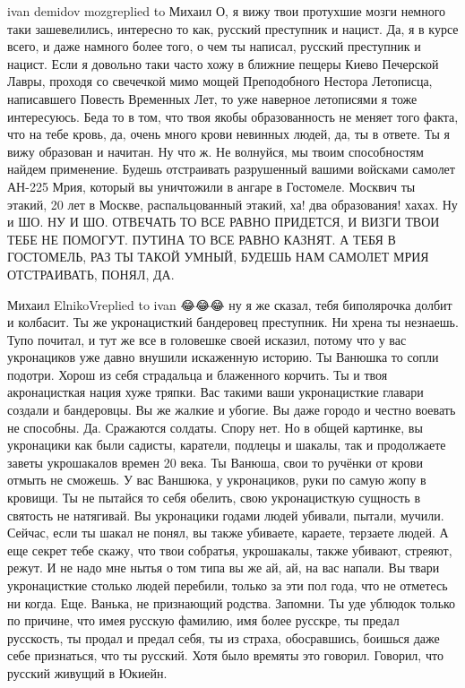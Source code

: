  
 
 
 
 


ivan demidov mozgreplied to Михаил
О, я вижу твои протухшие мозги немного таки зашевелились, интересно то как, русский преступник и нацист. Да, я в курсе всего, и даже намного более того, о чем ты написал, русский преступник и нацист. Если я довольно таки часто хожу в ближние пещеры Киево Печерской Лавры, проходя со свечечкой мимо мощей Преподобного Нестора Летописца, написавшего Повесть Временных Лет, то уже наверное летописями я тоже интересуюсь. Беда то в том, что твоя якобы образованность не меняет того факта, что на тебе кровь, да, очень много крови невинных людей, да, ты в ответе. Ты я вижу образован и начитан. Ну что ж. Не волнуйся, мы твоим способностям найдем применение. Будешь отстраивать разрушенный вашими войсками самолет АН-225 Мрия, который вы уничтожили в ангаре в Гостомеле. Москвич ты этакий, 20 лет в Москве, распальцованный этакий, ха! два образования! хахах. Ну и ШО. НУ И ШО. ОТВЕЧАТЬ ТО ВСЕ РАВНО ПРИДЕТСЯ, И ВИЗГИ ТВОИ ТЕБЕ НЕ ПОМОГУТ. ПУТИНА ТО ВСЕ РАВНО КАЗНЯТ. А ТЕБЯ В ГОСТОМЕЛЬ, РАЗ ТЫ ТАКОЙ УМНЫЙ, БУДЕШЬ НАМ САМОЛЕТ МРИЯ ОТСТРАИВАТЬ, ПОНЯЛ, ДА.

Михаил ElnikoVreplied to ivan
😂😂😂 ну я же сказал, тебя биполярочка долбит и колбасит. Ты же укронацисткий бандеровец преступник.
Ни хрена ты незнаешь. Тупо почитал, и тут же все в головешке своей исказил, потому что у вас укронациков уже давно внушили искаженную историю.
Ты Ванюшка то сопли подотри. Хорош из себя страдальца и блаженного корчить. Ты и твоя акронацисткая нация хуже тряпки. Вас такими ваши укронацисткие главари создали и бандеровцы. Вы же жалкие и убогие. Вы даже городо и честно воевать не способны. Да. Сражаются солдаты. Спору нет. Но в общей картинке, вы укронацики как были садисты, каратели, подлецы и шакалы, так и продолжаете заветы укрошакалов времен 20 века.
Ты Ванюша, свои то ручёнки от крови отмыть не сможешь. У вас Ваншюка, у укронациков, руки по самую жопу в кровищи. Ты не пытайся то себя обелить, свою укронацисткую сущность в святость не натягивай. Вы укронацики годами людей убивали, пытали, мучили. Сейчас, если ты шакал не понял, вы также убиваете, караете, терзаете людей. А еще секрет тебе скажу, что твои собратья, укрошакалы, также убивают, стреяют, режут. И не надо мне нытья о том типа вы же ай, ай, на вас напали. Вы твари укронацисткие столько людей перебили, только за эти пол года, что не отметесь ни когда.
Еще. Ванька, не признающий родства. Запомни. Ты уде ублюдок только по причине, что имея русскую фамилию, имя более русскре, ты предал русскость, ты продал и предал себя, ты из страха, обосравшись, боишься даже себе признаться, что ты русский. Хотя было времяты это говорил. Говорил, что русский живущий в Юкиейн.

